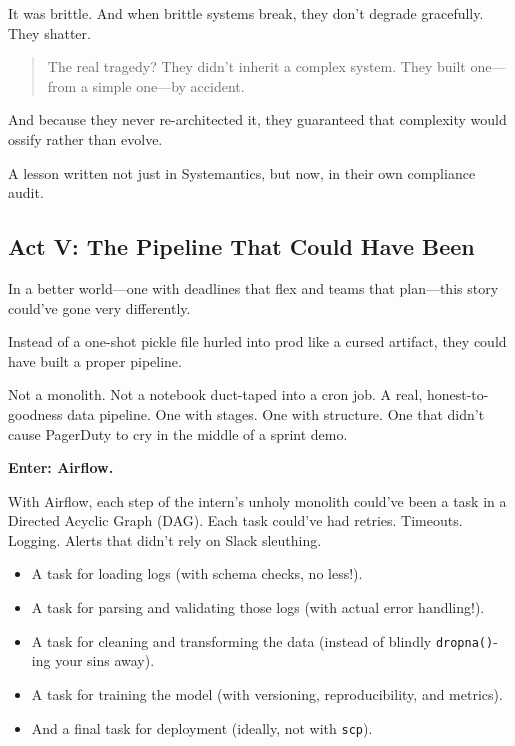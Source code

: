     It was brittle.  
    And when brittle systems break, they don’t degrade gracefully.  
    They shatter.
    
    \medskip
    
    \begin{quote}
    The real tragedy?  
    They didn’t inherit a complex system.
    They built one—from a simple one—by accident.
    \end{quote}
    
    And because they never re-architected it, they guaranteed that complexity would ossify rather than evolve.
    
    A lesson written not just in Systemantics, but now, in their own compliance audit.
    














\subsection{Act V: The Pipeline That Could Have Been}

In a better world—one with deadlines that flex and teams that plan—this story could’ve gone very differently.

Instead of a one-shot pickle file hurled into prod like a cursed artifact, they could have built a proper pipeline.

Not a monolith. Not a notebook duct-taped into a cron job. A real, honest-to-goodness data pipeline. One with stages. One with structure. One that didn’t cause PagerDuty to cry in the middle of a sprint demo.

\textbf{Enter: Airflow.}

With Airflow, each step of the intern’s unholy monolith could’ve been a task in a Directed Acyclic Graph (DAG). Each task could’ve had retries. Timeouts. Logging. Alerts that didn’t rely on Slack sleuthing.

\begin{itemize}
  \item A task for loading logs (with schema checks, no less!).
  \item A task for parsing and validating those logs (with actual error handling!).
  \item A task for cleaning and transforming the data (instead of blindly \texttt{dropna()}-ing your sins away).
  \item A task for training the model (with versioning, reproducibility, and metrics).
  \item And a final task for deployment (ideally, not with \texttt{scp}).
\end{itemize}

